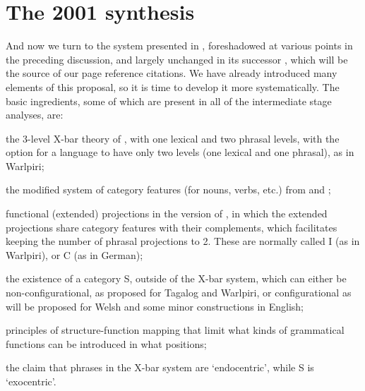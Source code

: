 \documentclass[output=paper,hidelinks]{langscibook}
\begin{document}
\section{The 2001 synthesis}\label{synthsec}
And now we turn to the system presented in \citet{bresnan2001lexical},
foreshadowed at various points in the preceding discussion,
and largely unchanged in its successor \citep{BresnanEtAl2016},
which will be the source of our page reference citations.
We have already introduced many elements of this proposal, so it is time to develop
it more systematically.  The basic ingredients, some of which are present in all
of the intermediate stage analyses, are:
\ea
\begin{xlist}
\item the 3-level X-bar theory of \citet{chomsky1970remarks}, with one lexical
and two phrasal levels, with the option
 for a language to have only two levels (one lexical and one phrasal), as in
 Warlpiri;
\item the modified system of category features (for nouns, verbs, etc.) from
\citet{jackendoff1977} and \citet{bresnan1982control-complementation};
\item functional (extended) projections in the version of
\citet{grimshaw00ep}, in which the extended projections share category features
  with their complements, which facilitates keeping the number of phrasal projections
  to 2. These are normally called I (as in Warlpiri), or C (as in German);
\item the existence of a category S, outside of the X-bar system, which
can either be non-configurational, as proposed for Tagalog
and Warlpiri, or configurational as will be proposed for Welsh and some minor
constructions in English;
\item principles of structure-function mapping that limit what kinds of grammatical
functions can be introduced in what positions;
\item the claim that phrases in the X-bar system are `endocentric', while S is `exocentric'.
\end{xlist}
\z
\end{document}
